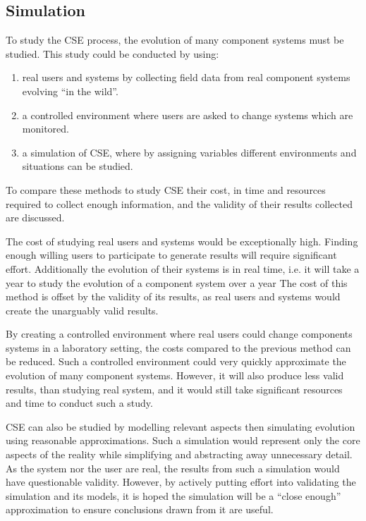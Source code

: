 \subsection{Simulation}
To study the CSE process, the evolution of many component systems must be studied.
This study could be conducted by using:
\begin{enumerate}
  \item real users and systems by collecting field data from real component systems evolving ``in the wild''.
  \item a controlled environment where users are asked to change systems which are monitored.
  \item a simulation of CSE, where by assigning variables different environments and situations can be studied.
\end{enumerate} 

To compare these methods to study CSE their cost, in time and resources required to collect enough information,
and the validity of their results collected are discussed.

The cost of studying real users and systems would be exceptionally high.
Finding enough willing users to participate to generate results will require significant effort.
Additionally the evolution of their systems is in real time, i.e. it will take a year to study the evolution of a component system over a year
The cost of this method is offset by the validity of its results, as real users and systems would create the unarguably valid results.

By creating a controlled environment where real users could change components systems in a laboratory setting,
the costs compared to the previous method can be reduced.
Such a controlled environment could very quickly approximate the evolution of many component systems.  
However, it will also produce less valid results, than studying real system, 
and it would still take significant resources and time to conduct such a study.

CSE can also be studied by modelling relevant aspects then simulating evolution using reasonable approximations.
Such a simulation would represent only the core aspects of the reality while simplifying and abstracting away unnecessary detail.
As the system nor the user are real, the results from such a simulation would have questionable validity.
However, by actively putting effort into validating the simulation and its models,
it is hoped the simulation will be a ``close enough'' approximation to ensure conclusions drawn from it are useful.

